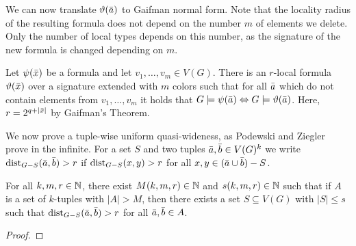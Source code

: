 We can now translate $\vartheta(\bar{a})$ to Gaifman normal form. 
Note that the locality radius of the resulting formula does not depend
on the number $m$ of elements we delete. Only the number of local types
depends on this number, as the signature of the new formula is changed
depending on $m$. 

\begin{theorem}
Let $\psi(\bar{x})$ be a formula and let $v_1,\ldots, v_m\in V(G)$. 
There is an $r$-local formula $\vartheta(\bar{x})$ 
over a signature extended 
with $m$ colors such that for all $\bar{a}$ which do not
contain elements from $v_1,\ldots, v_m$ it holds that
$G\models\psi(\bar{a})\Leftrightarrow G\models\vartheta(\bar{a})$. 
Here, $r=2^{q+|\bar{x}|}$ by Gaifman's Theorem.
\end{theorem}

We now prove a tuple-wise uniform quasi-wideness, as Podewski and Ziegler 
prove in the infinite. For a set $S$ and two tuples $\bar{a},\bar{b}\in V(G)^k$
we write $\mathrm{dist}_{G-S}(\bar{a},\bar{b})>r$ if $\mathrm{dist}_{G-S}(x,y)>r$ for all $x,y\in 
(\bar{a}\cup\bar{b})- S$. 

\begin{lemma}
For all $k,m,r\in \mathbb{N}$, there exist $M(k,m,r)\in \mathbb{N}$ and 
$s(k,m,r)\in \mathbb{N}$ such that if $A$ is a set of $k$-tuples
with $|A|>M$, then there exists a set $S\subseteq V(G)$
with $|S|\leq s$ such that $\mathrm{dist}_{G-S}(\bar{a},\bar{b})>r$
for all $\bar{a},\bar{b}\in A$. 
\end{lemma}
\begin{proof}

\end{proof}
